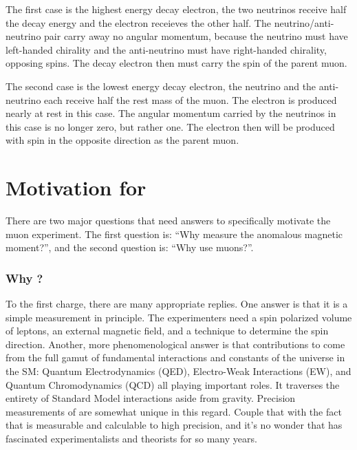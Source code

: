 The first case is the highest energy decay electron, the two neutrinos receive half the decay energy and the electron receieves the other half.  The neutrino/anti-neutrino pair carry away no angular momentum, because the neutrino must have left-handed chirality and the anti-neutrino must have right-handed chirality, opposing spins.  The decay electron then must carry the spin of the parent muon.

The second case is the lowest energy decay electron, the neutrino and the anti-neutrino each receive half the rest mass of the muon.  The electron is produced nearly at rest in this case.  The angular momentum carried by the neutrinos in this case is no longer zero, but rather one.  The electron then will be produced with spin in the opposite direction as the parent muon.

\section{Motivation for \mugmtwo}
There are two major questions that need answers to specifically motivate the muon \gmtwo experiment.  The first question is: ``Why measure the anomalous magnetic moment?'', and the second question is: ``Why use muons?''.

\subsubsection{Why \gmtwo?}
To the first charge, there are many appropriate replies.  One answer is that it is a simple measurement in principle.  The experimenters need a spin polarized volume of leptons, an external magnetic field, and a technique to determine the spin direction. Another, more phenomenological answer is that contributions to \gmtwo come from the full gamut of fundamental interactions and constants of the universe in the SM: Quantum Electrodynamics (QED), Electro-Weak Interactions (EW), and Quantum Chromodynamics (QCD) all playing important roles. It traverses the entirety of Standard Model interactions aside from gravity. Precision measurements of \gmtwo are somewhat unique in this regard.  Couple that with the fact that \gmtwo is measurable and calculable to high precision, and it's no wonder that \gmtwo  has fascinated experimentalists and theorists for so many years.

